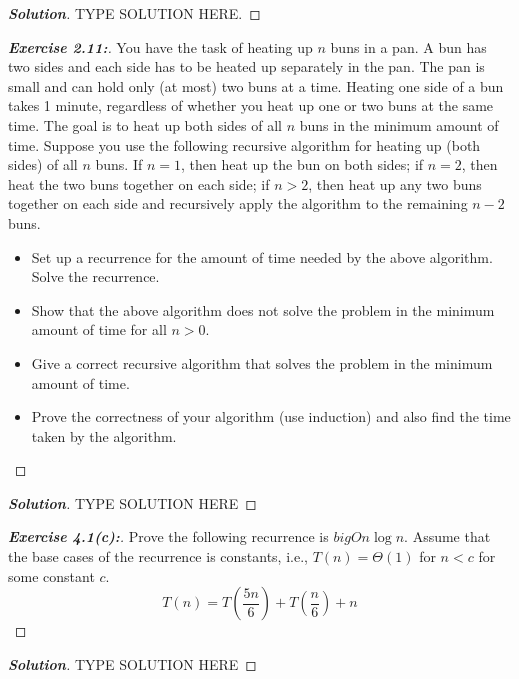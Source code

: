 \documentclass[a4paper]{article}
\newenvironment{solution}{\begin{proof}[\textnormal{\textbf{Solution}}]}{\end{proof}}
\newenvironment{exercise}[1]{\begin{proof}[\textnormal{\textbf{Exercise #1:}}]\renewcommand{\qedsymbol}{}}{\end{proof}}
\newcommand{\bigTh}[1]{\Theta\left(#1\right)}
\begin{document}
\begin{solution}
    TYPE SOLUTION HERE.
\end{solution}

\begin{exercise}{2.11}

    You have the task of heating up \(n\) buns in a pan. A bun has two sides and each side has to be heated up separately in the pan. The pan is small and can hold only (at most) two buns at a time. Heating one side of a bun takes 1 minute, regardless of whether you heat up one or two buns at the same time. The goal is to heat up both sides of all \(n\) buns in the minimum amount of time. Suppose you use the following recursive algorithm for heating up (both sides) of all \(n\) buns. If \(n = 1\), then heat up the bun on both sides;  if \(n = 2\), then heat the two buns together on each side; if \(n > 2\), then heat up any two buns together on each side and recursively apply the algorithm to the remaining \(n − 2\) buns.

    \begin{itemize}
        \item Set up a recurrence for the amount of time needed by the above algorithm. Solve the recurrence.
        \item Show that the above algorithm does not solve the problem in the minimum amount of time for all \(n >0\).
        \item Give a correct recursive algorithm that solves the problem in the minimum amount of time.
        \item Prove the correctness of your algorithm (use induction) and also find the time taken by the algorithm.
    \end{itemize}
\end{exercise}

\begin{solution}
    TYPE SOLUTION HERE
\end{solution}

\begin{exercise}{4.1(c)}
    Prove the following recurrence is \(bigO{n\log{n}}\). Assume that the base cases of the recurrence is constants, i.e., \(T(n) = \bigTh{1}\) for \(n < c\) for some constant \(c\).
    \[T(n) = T\left(\frac{5n}{6}\right) + T\left(\frac{n}{6}\right) + n\]
\end{exercise}

\begin{solution}
    TYPE SOLUTION HERE
\end{solution}
\end{document}
